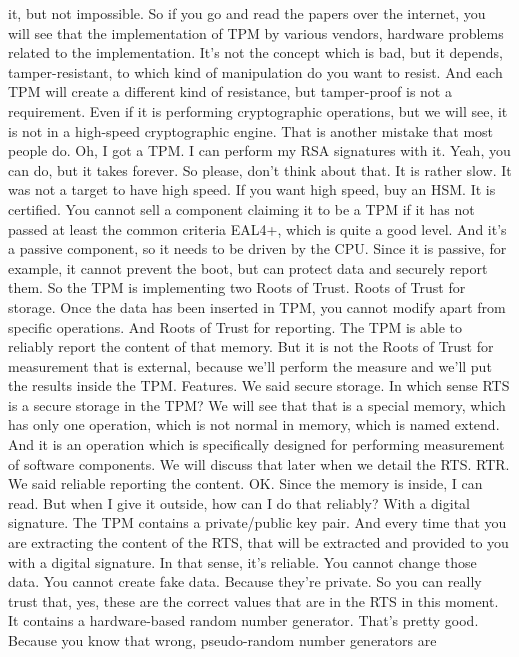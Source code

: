  it, but not impossible. So if you go and read the papers over the internet,
 you will see that the implementation of TPM by various vendors, hardware
 problems related to the implementation. It's not the concept which is bad, but
 it depends, tamper-resistant, to which kind of manipulation do you want to
 resist. And each TPM will create a different kind of resistance, but
 tamper-proof is not a requirement. Even if it is performing cryptographic
 operations, but we will see, it is not in a high-speed cryptographic engine.
 That is another mistake that most people do. Oh, I got a TPM. I can perform my
 RSA signatures with it. Yeah, you can do, but it takes forever. So please,
 don't think about that. It is rather slow. It was not a target to have high
 speed. If you want high speed, buy an HSM. It is certified. You cannot sell a
 component claiming it to be a TPM if it has not passed at least the common
 criteria EAL4+, which is quite a good level. And it's a passive component, so
 it needs to be driven by the CPU. Since it is passive, for example, it cannot
 prevent the boot, but can protect data and securely report them. So the TPM is
 implementing two Roots of Trust. Roots of Trust for storage. Once the data has
 been inserted in TPM, you cannot modify apart from specific operations. And
 Roots of Trust for reporting. The TPM is able to reliably report the content
 of that memory. But it is not the Roots of Trust for measurement that is
 external, because we'll perform the measure and we'll put the results inside
 the TPM. Features. We said secure storage. In which sense RTS is a secure
 storage in the TPM? We will see that that is a special memory, which has only
 one operation, which is not normal in memory, which is named extend. And it is
 an operation which is specifically designed for performing measurement of
 software components. We will discuss that later when we detail the RTS. RTR.
 We said reliable reporting the content. OK. Since the memory is inside, I can
 read. But when I give it outside, how can I do that reliably? With a digital
 signature. The TPM contains a private/public key pair. And every time that you
 are extracting the content of the RTS, that will be extracted and provided to
 you with a digital signature. In that sense, it's reliable. You cannot change
 those data. You cannot create fake data. Because they're private. So you can
 really trust that, yes, these are the correct values that are in the RTS in
 this moment. It contains a hardware-based random number generator. That's
 pretty good. Because you know that wrong, pseudo-random number generators are
